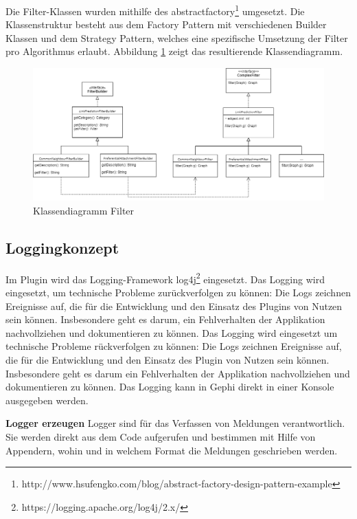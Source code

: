 Die Filter-Klassen wurden mithilfe des \acs{abstractfactory}\footnote{http://www.hsufengko.com/blog/abstract-factory-design-pattern-example} umgesetzt. Die Klassenstruktur besteht aus dem Factory Pattern mit verschiedenen Builder Klassen und dem Strategy Pattern, welches eine spezifische Umsetzung der Filter pro Algorithmus erlaubt. Abbildung \ref{fig:class_filter} zeigt das resultierende Klassendiagramm.
\begin{figure}
    \centering
    \includegraphics[width=\linewidth]{resources/class_Filter.png}
    \caption{Klassendiagramm Filter}
    \label{fig:class_filter}
\end{figure}

\subsection{Loggingkonzept}
\label{loggingkonzept}

Im Plugin wird das Logging-Framework log4j\footnote{https://logging.apache.org/log4j/2.x/} eingesetzt.
Das Logging wird eingesetzt, um technische Probleme zurückverfolgen zu können: Die Logs zeichnen Ereignisse auf, die für die Entwicklung und den Einsatz des Plugins von Nutzen sein können.
Insbesondere geht es darum, ein Fehlverhalten der Applikation nachvollziehen und dokumentieren zu können.
Das Logging wird eingesetzt um technische Probleme rückverfolgen zu können: Die Logs zeichnen Ereignisse auf, die für die Entwicklung und den Einsatz des Plugin von Nutzen sein können.
Insbesondere geht es darum ein Fehlverhalten der Applikation nachvollziehen und dokumentieren zu können. Das Logging kann in Gephi direkt in einer Konsole ausgegeben werden.

\newpage
\textbf{Logger erzeugen}
Logger sind für das Verfassen von Meldungen verantwortlich. Sie werden direkt aus dem Code aufgerufen und bestimmen mit Hilfe von Appendern, wohin und in welchem Format die Meldungen geschrieben werden.

